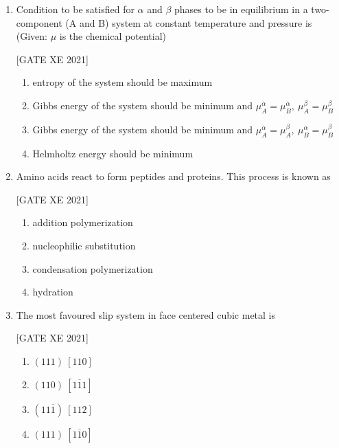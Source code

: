 \documentclass[journal,12pt,onecolumn]{IEEEtran}
\theoremstyle{remark}
\begin{document}
\begin{enumerate}
\item Condition to be satisfied for $\alpha$ and $\beta$ phases to be in equilibrium in a two-component (A and B) system at constant temperature and pressure is (Given: $\mu$ is the chemical potential)

\hfill[GATE XE 2021]

\begin{multicols}{2}
\begin{enumerate}
\item entropy of the system should be maximum
\item Gibbs energy of the system should be minimum and $\mu_A^{\alpha}=\mu_B^{\alpha},\ \mu_A^{\beta}=\mu_B^{\beta}$
\item Gibbs energy of the system should be minimum and $\mu_A^{\alpha}=\mu_A^{\beta},\ \mu_B^{\alpha}=\mu_B^{\beta}$
\item Helmholtz energy should be minimum
\end{enumerate}
\end{multicols}

\item Amino acids react to form peptides and proteins. This process is known as

\hfill[GATE XE 2021]

\begin{multicols}{2}
\begin{enumerate}
\item addition polymerization
\item nucleophilic substitution
\item condensation polymerization
\item hydration
\end{enumerate}
\end{multicols}

\item The most favoured slip system in face centered cubic metal is

\hfill[GATE XE 2021]

\begin{multicols}{2}
\begin{enumerate}
\item $(111)\ [110]$
\item $(110)\ [1\overline{1}1]$
\item $(11\overline{1})\ [112]$
\item $(111)\ [1\overline{1}0]$
\end{enumerate}
\end{multicols}


\end{enumerate}
\end{document}
